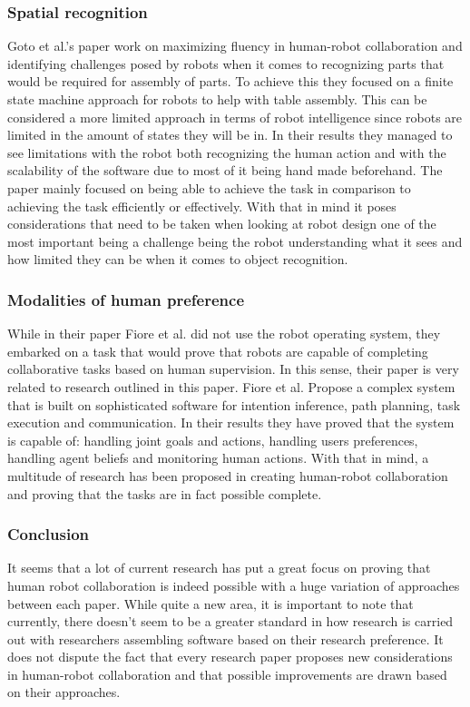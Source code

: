 \documentclass{report}
\begin{document}
      \subsubsection{Spatial recognition}
        Goto et al.'s\cite{Hiraki} paper work on maximizing fluency in human-robot collaboration and identifying challenges posed by robots when it comes to recognizing parts that would be required for assembly of parts. To achieve this they focused on a finite state machine approach for robots to help with table assembly. This can be considered a more limited approach in terms of robot intelligence since robots are limited in the amount of states they will be in. In their results they managed to see limitations with the robot both recognizing the human action and with the scalability of the software due to most of it being hand made beforehand. The paper mainly focused on being able to achieve the task in comparison to achieving the task efficiently or effectively. With that in mind it poses considerations that need to be taken when looking at robot design one of the most important being a challenge being the robot understanding what it sees and how limited they can be when it comes to object recognition.

      \subsubsection{Modalities of human preference}
        While in their paper Fiore et al.\cite{Fiore} did not use the robot operating system, they embarked on a task that would prove that robots are capable of completing collaborative tasks based on human supervision. In this sense, their paper is very related to research outlined in this paper. Fiore et al. Propose a complex system that is built on sophisticated software for intention inference, path planning, task execution and communication. In their results they have proved that the system is capable of: handling joint goals and actions, handling users preferences, handling agent beliefs and monitoring human actions. With that in mind, a multitude of research has been proposed in creating human-robot collaboration and proving that the tasks are in fact possible complete.

      \subsubsection{Conclusion}
        It seems that a lot of current research has put a great focus on proving that human robot collaboration is indeed possible with a huge variation of approaches between each paper. While quite a new area, it is important to note that currently, there doesn't seem to be a greater standard in how research is carried out with researchers assembling software based on their research preference. It does not dispute the fact that every research paper proposes new considerations in human-robot collaboration and that possible improvements are drawn based on their approaches.
\end{document}
